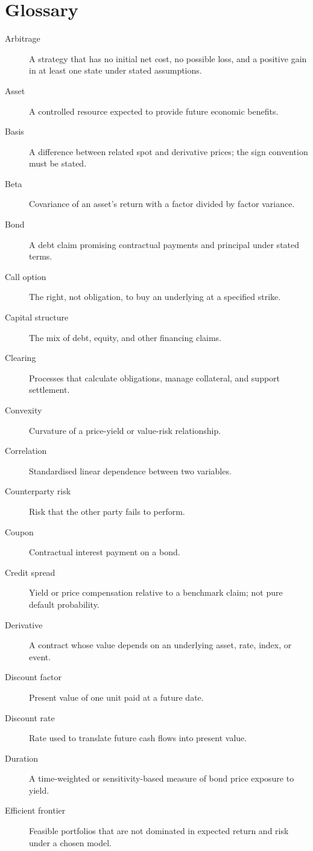 \chapter{Glossary}

\begin{description}
\item[Arbitrage] A strategy that has no initial net cost, no possible loss, and a positive gain in at least one state under stated assumptions.
\item[Asset] A controlled resource expected to provide future economic benefits.
\item[Basis] A difference between related spot and derivative prices; the sign convention must be stated.
\item[Beta] Covariance of an asset's return with a factor divided by factor variance.
\item[Bond] A debt claim promising contractual payments and principal under stated terms.
\item[Call option] The right, not obligation, to buy an underlying at a specified strike.
\item[Capital structure] The mix of debt, equity, and other financing claims.
\item[Clearing] Processes that calculate obligations, manage collateral, and support settlement.
\item[Convexity] Curvature of a price-yield or value-risk relationship.
\item[Correlation] Standardised linear dependence between two variables.
\item[Counterparty risk] Risk that the other party fails to perform.
\item[Coupon] Contractual interest payment on a bond.
\item[Credit spread] Yield or price compensation relative to a benchmark claim; not pure default probability.
\item[Derivative] A contract whose value depends on an underlying asset, rate, index, or event.
\item[Discount factor] Present value of one unit paid at a future date.
\item[Discount rate] Rate used to translate future cash flows into present value.
\item[Duration] A time-weighted or sensitivity-based measure of bond price exposure to yield.
\item[Efficient frontier] Feasible portfolios that are not dominated in expected return and risk under a chosen model.

\end{description}
